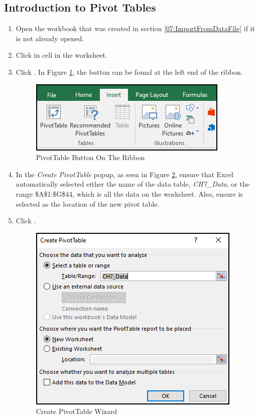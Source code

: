 \subsection{Introduction to Pivot Tables}

\begin{enumbox}
	\begin{enumerate}
		\item Open the  workbook that was created in section \ref{07:ImportFromDataFile} if it is not already opened.
		\item Click in cell  in the  worksheet.
		\item Click . In Figure \ref{07:fig11}, the  button can be found at the left end of the ribbon.

		\begin{figure}[H]
			\centering
			\includegraphics[width=\maxwidth{.75\linewidth}]{gfx/ch07_fig11}
			\caption{PivotTable Button On The Ribbon}
			\label{07:fig11}
		\end{figure}

		\item In the \textit{Create PivotTable} popup, as seen in Figure \ref{07:fig12}, ensure that Excel automatically selected either the name of the data table, \textit{CH7\_Data}, or the range \$A\$1:\$G\$44, which is all the data on the worksheet. Also, ensure  is selected as the location of the new pivot table. 
		\item Click .

		\begin{figure}[H]
			\centering
			\includegraphics[width=\maxwidth{.75\linewidth}]{gfx/ch07_fig12}
			\caption{Create PivotTable Wizard}
			\label{07:fig12}
		\end{figure}


\end{enumerate}
\end{enumbox}
